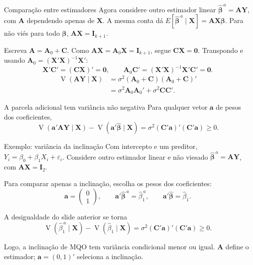 \documentclass[
  ignorenonframetext,
  brazilian,
  aspectratio=169,
  10pt]{beamer}
\begin{document}
\begin{frame}{Comparação entre estimadores}
\protect{}\label{comparauxe7uxe3o-entre-estimadores}
Agora considere outro estimador linear
\(\widehat{\boldsymbol\beta}^{\,a}
=\mathbf A\mathbf Y\), com \(\mathbf A\) dependendo apenas de
\(\mathbf X\). A mesma conta dá
\(E[\widehat{\boldsymbol\beta}^{\,a}\mid\mathbf X]
=\mathbf A\mathbf X\boldsymbol\beta\). Para não viés para todo
\(\boldsymbol\beta\), \(\mathbf A\mathbf X=\mathbf I_{k+1}\).

Escreva \(\mathbf A=\mathbf A_0+\mathbf C\). Como
\(\mathbf A\mathbf X=\mathbf A_0\mathbf X=\mathbf I_{k+1}\), segue
\(\mathbf C\mathbf X=\mathbf 0\). Transpondo e usando
\(\mathbf A_0=(\mathbf X'\mathbf X)^{-1}\mathbf X'\): \[
\mathbf X'\mathbf C'=(\mathbf C\mathbf X)'=\mathbf 0,
\qquad
\mathbf A_0\mathbf C'=(\mathbf X'\mathbf X)^{-1}\mathbf X'\mathbf C'=\mathbf 0.
\] \[
\begin{aligned}
\operatorname{V}(\mathbf A\mathbf Y\mid\mathbf X)
&=\sigma^2(\mathbf A_0+\mathbf C)(\mathbf A_0+\mathbf C)'\\
&=\sigma^2\mathbf A_0\mathbf A_0'+\sigma^2\mathbf C\mathbf C'.
\end{aligned}
\]

\begin{block}{A parcela adicional tem variância não negativa}
Para qualquer vetor $\mathbf a$ de pesos dos coeficientes,
\[
\operatorname{V}(\mathbf a'\mathbf A\mathbf Y\mid\mathbf X)
-\operatorname{V}(\mathbf a'\widehat{\boldsymbol\beta}\mid\mathbf X)
=\sigma^2(\mathbf C'\mathbf a)'(\mathbf C'\mathbf a)\geq0.
\]
\end{block}
\end{frame}

\begin{frame}{Exemplo: variância da inclinação}
\protect{}\label{exemplo-variuxe2ncia-da-inclinauxe7uxe3o}
Com intercepto e um preditor, \(Y_i=\beta_0+\beta_1X_i+\varepsilon_i\).
Considere outro estimador linear e não viesado
\(\widehat{\boldsymbol\beta}^{\,a}=\mathbf A\mathbf Y\), com
\(\mathbf A\mathbf X=\mathbf I_2\).

Para comparar apenas a inclinação, escolha os pesos dos coeficientes: \[
\mathbf a=\begin{pmatrix}0\\1\end{pmatrix},\qquad
\mathbf a'\widehat{\boldsymbol\beta}^{\,a}=\widehat\beta^{\,a}_1,
\qquad
\mathbf a'\widehat{\boldsymbol\beta}=\widehat\beta_1.
\]

A desigualdade do slide anterior se torna \[
\operatorname{V}(\widehat\beta^{\,a}_1\mid\mathbf X)
-\operatorname{V}(\widehat\beta_1\mid\mathbf X)
=\sigma^2(\mathbf C'\mathbf a)'(\mathbf C'\mathbf a)\geq0.
\]

Logo, a inclinação de MQO tem variância condicional menor ou igual.
\(\mathbf A\) define o estimador; \(\mathbf a=(0,1)'\) seleciona a
inclinação.
\end{frame}
\end{document}
